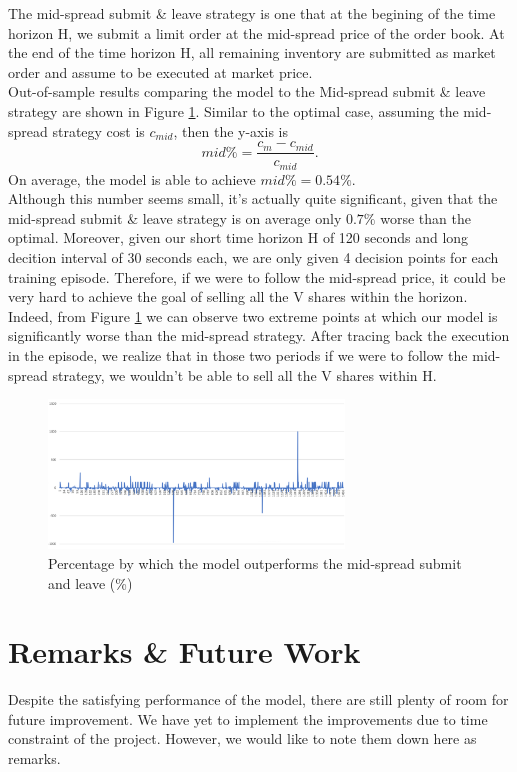 \documentclass[12pt]{extarticle}
\begin{document}
The mid-spread submit \& leave strategy is one that at the begining of the time
horizon H, we submit a limit order at the mid-spread price of the order book.
At the end of the time horizon H, all remaining inventory are submitted as market
order and assume to be executed at market price.\\


\noindent Out-of-sample results comparing the model to the Mid-spread submit \& leave strategy are shown
in Figure \ref{midspread}. Similar to the optimal case, assuming the mid-spread strategy
cost is $c_{mid}$, then the y-axis is $$mid\% = \frac{c_{m} - c_{mid}}{c_{mid}}.$$
On average, the model is able to achieve $mid\% = 0.54\%$.\\


\noindent Although this number seems small, it's actually quite significant, given that the
mid-spread submit \& leave strategy is on average only $0.7\%$ worse than the optimal.
Moreover, given our short time horizon H of 120 seconds and long decition interval
of 30 seconds each, we are only given 4 decision points for each training episode.
Therefore, if we were to follow the mid-spread price, it could be very hard to achieve the
goal of selling all the V shares within the horizon. Indeed, from Figure \ref{midspread}
we can observe two extreme points at which our model is significantly worse than
the mid-spread strategy. After tracing back the execution in the episode,
we realize that in those two periods if we were to follow the mid-spread strategy,
we wouldn't be able to sell all the V shares within H.


\begin{figure}[h]
\centering
\includegraphics[width=0.7\textwidth]{midspread}
\caption{Percentage by which the model outperforms the mid-spread submit and leave (\%)}
\label{midspread}
\end{figure}

\section{Remarks \& Future Work}
Despite the satisfying performance of the model, there are still plenty of room
for future improvement. We have yet to implement the improvements due to time constraint
of the project. However, we would like to note them down here as remarks.
\end{document}
